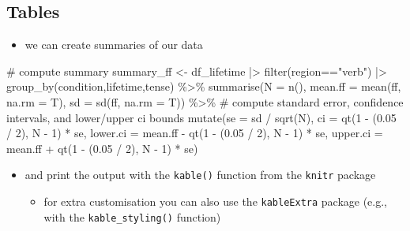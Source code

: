 \documentclass[
  letterpaper,
  DIV=11,
  numbers=noendperiod]{scrartcl}
\newenvironment{Shaded}{\begin{snugshade}}{\end{snugshade}}
\newcommand{\AttributeTok}[1]{\textcolor[rgb]{0.40,0.45,0.13}{#1}}
\newcommand{\CommentTok}[1]{\textcolor[rgb]{0.37,0.37,0.37}{#1}}
\newcommand{\DecValTok}[1]{\textcolor[rgb]{0.68,0.00,0.00}{#1}}
\newcommand{\FloatTok}[1]{\textcolor[rgb]{0.68,0.00,0.00}{#1}}
\newcommand{\FunctionTok}[1]{\textcolor[rgb]{0.28,0.35,0.67}{#1}}
\newcommand{\NormalTok}[1]{\textcolor[rgb]{0.00,0.23,0.31}{#1}}
\newcommand{\OtherTok}[1]{\textcolor[rgb]{0.00,0.23,0.31}{#1}}
\newcommand{\SpecialCharTok}[1]{\textcolor[rgb]{0.37,0.37,0.37}{#1}}
\newcommand{\StringTok}[1]{\textcolor[rgb]{0.13,0.47,0.30}{#1}}
\providecommand{\tightlist}{%
  \setlength{\itemsep}{0pt}\setlength{\parskip}{0pt}}\usepackage{longtable,booktabs,array}
\begin{document}
\hypertarget{tables}{%
\subsection{Tables}\label{tables}}

\begin{itemize}
\tightlist
\item
  we can create summaries of our data
\end{itemize}

\begin{Shaded}
\begin{Highlighting}[]
\CommentTok{\# compute summary }
\NormalTok{summary\_ff }\OtherTok{\textless{}{-}}\NormalTok{ df\_lifetime }\SpecialCharTok{|\textgreater{}} 
  \FunctionTok{filter}\NormalTok{(region}\SpecialCharTok{==}\StringTok{"verb"}\NormalTok{) }\SpecialCharTok{|\textgreater{}} 
  \FunctionTok{group\_by}\NormalTok{(condition,lifetime,tense) }\SpecialCharTok{\%\textgreater{}\%}
  \FunctionTok{summarise}\NormalTok{(}\AttributeTok{N =} \FunctionTok{n}\NormalTok{(),}
            \AttributeTok{mean.ff =} \FunctionTok{mean}\NormalTok{(ff, }\AttributeTok{na.rm =}\NormalTok{ T),}
            \AttributeTok{sd =} \FunctionTok{sd}\NormalTok{(ff, }\AttributeTok{na.rm =}\NormalTok{ T)) }\SpecialCharTok{\%\textgreater{}\%}
  \CommentTok{\# compute standard error, confidence intervals, and lower/upper ci bounds}
  \FunctionTok{mutate}\NormalTok{(}\AttributeTok{se =}\NormalTok{ sd }\SpecialCharTok{/} \FunctionTok{sqrt}\NormalTok{(N),}
         \AttributeTok{ci =} \FunctionTok{qt}\NormalTok{(}\DecValTok{1} \SpecialCharTok{{-}}\NormalTok{ (}\FloatTok{0.05} \SpecialCharTok{/} \DecValTok{2}\NormalTok{), N }\SpecialCharTok{{-}} \DecValTok{1}\NormalTok{) }\SpecialCharTok{*}\NormalTok{ se,}
         \AttributeTok{lower.ci =}\NormalTok{ mean.ff }\SpecialCharTok{{-}} \FunctionTok{qt}\NormalTok{(}\DecValTok{1} \SpecialCharTok{{-}}\NormalTok{ (}\FloatTok{0.05} \SpecialCharTok{/} \DecValTok{2}\NormalTok{), N }\SpecialCharTok{{-}} \DecValTok{1}\NormalTok{) }\SpecialCharTok{*}\NormalTok{ se,}
         \AttributeTok{upper.ci =}\NormalTok{ mean.ff }\SpecialCharTok{+} \FunctionTok{qt}\NormalTok{(}\DecValTok{1} \SpecialCharTok{{-}}\NormalTok{ (}\FloatTok{0.05} \SpecialCharTok{/} \DecValTok{2}\NormalTok{), N }\SpecialCharTok{{-}} \DecValTok{1}\NormalTok{) }\SpecialCharTok{*}\NormalTok{ se)}
\end{Highlighting}
\end{Shaded}

\begin{itemize}
\tightlist
\item
  and print the output with the \texttt{kable()} function from the
  \texttt{knitr} package

  \begin{itemize}
  \tightlist
  \item
    for extra customisation you can also use the \texttt{kableExtra}
    package (e.g., with the \texttt{kable\_styling()} function)
  \end{itemize}
\end{itemize}
\end{document}
